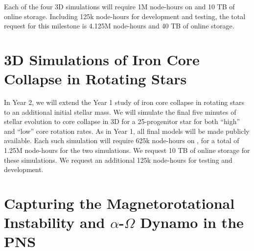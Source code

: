 \documentclass[12pt]{article}
\begin{document}
Each of the four 3D simulations will require 1M node-hours on \mira and 10 TB of online storage.
Including 125k \mira node-hours for development and testing, the total request for this milestone is 4.125M \mira node-hours and 40 TB of online storage.



\section{3D Simulations of Iron Core Collapse in Rotating Stars}
\label{sec:Y2progen}

In Year 2, we will extend the Year 1 study of iron core collapse in rotating stars to an additional initial stellar mass.
We will simulate the final five minutes of stellar evolution to core collapse in 3D for a 25-\msun progenitor star for both ``high'' and ``low'' core rotation rates.
As in Year 1, all final models will be made publicly available.
Each such simulation will require 625k node-hours on \mira, for a total of 1.25M node-hours for the two simulations.
We request 10 TB of online storage for these simulations.
We request an additional 125k node-hours for testing and development.
 
\section{Capturing the Magnetorotational Instability and $\alpha$-$\Omega$ Dynamo in the PNS}
\end{document}
